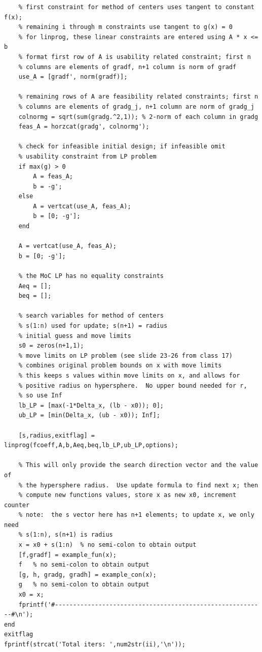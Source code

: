 \documentclass[12pt]{article}
\begin{document}
\begin{enumerate}[I]
\begin{enumerate}[1)]
\begin{lstlisting}
    % first constraint for method of centers uses tangent to constant f(x);
    % remaining i through m constraints use tangent to g(x) = 0
    % for linprog, these linear constraints are entered using A * x <= b 
    % format first row of A is usability related constraint; first n 
    % columns are elements of gradf, n+1 column is norm of gradf
    use_A = [gradf', norm(gradf)];
    
    % remaining rows of A are feasibility related constraints; first n
    % columns are elements of gradg_j, n+1 column are norm of gradg_j
    colnormg = sqrt(sum(gradg.^2,1)); % 2-norm of each column in gradg
    feas_A = horzcat(gradg', colnormg');
    
    % check for infeasible initial design; if infeasible omit
    % usability constraint from LP problem
    if max(g) > 0
        A = feas_A;
        b = -g';
    else
        A = vertcat(use_A, feas_A);
        b = [0; -g'];
    end
    
    A = vertcat(use_A, feas_A);
    b = [0; -g'];
    
    % the MoC LP has no equality constraints
    Aeq = [];
    beq = [];
    
    % search variables for method of centers
    % s(1:n) used for update; s(n+1) = radius
    % initial guess and move limits
    s0 = zeros(n+1,1);
    % move limits on LP problem (see slide 23-26 from class 17)
    % combines original problem bounds on x with move limits
    % this keeps s values within move limits on x, and allows for
    % positive radius on hypersphere.  No upper bound needed for r,
    % so use Inf
    lb_LP = [max(-1*Delta_x, (lb - x0)); 0];      
    ub_LP = [min(Delta_x, (ub - x0)); Inf];      
    
    [s,radius,exitflag] = linprog(fcoeff,A,b,Aeq,beq,lb_LP,ub_LP,options);
    
    % This will only provide the search direction vector and the value of
    % the hypersphere radius.  Use update formula to find next x; then
    % compute new functions values, store x as new x0, increment counter
    % note:  the s vector here has n+1 elements; to update x, we only need 
    % s(1:n), s(n+1) is radius
    x = x0 + s(1:n)  % no semi-colon to obtain output
    [f,gradf] = example_fun(x);
    f   % no semi-colon to obtain output
    [g, h, gradg, gradh] = example_con(x);
    g   % no semi-colon to obtain output
    x0 = x;
    fprintf('#----------------------------------------------------------#\n');
end
exitflag
fprintf(strcat('Total iters: ',num2str(ii),'\n'));
\end{lstlisting}


\end{enumerate}
\end{enumerate}
\end{document}
